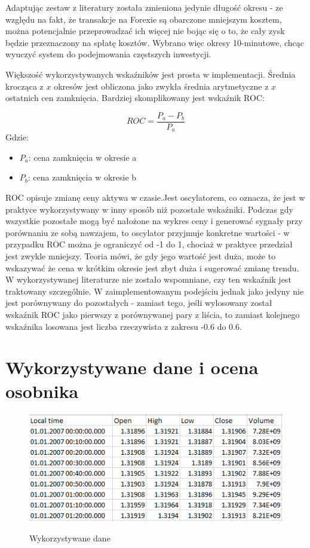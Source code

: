 \documentclass[twoside]{iisthesis}
\begin{document}
Adaptując zestaw z literatury została zmieniona jedynie długość okresu - ze względu na fakt, że transakcje na Forexie są obarczone mniejszym kosztem, można potencjalnie przeprowadzać ich więcej nie bojąc się o to, że cały zysk będzie przeznaczony na spłatę kosztów. Wybrano więc okresy 10-minutowe, chcąc wyuczyć system do podejmowania częstszych inwestycji.

Większość wykorzystywanych wskaźników jest prosta w implementacji. Średnia krocząca z $x$ okresów jest obliczona jako zwykła średnia arytmetyczne z $x$ ostatnich cen zamknięcia. Bardziej skomplikowany jest wskaźnik ROC:

\[ROC= \frac{P_{a} - P_{b}}{P_{a}}\]
Gdzie:
\begin{itemize}[label=]
	\item $P_a$: cena zamknięcia w okresie a
	\item $P_b$: cena zamknięcia w okresie b
\end{itemize}

ROC opisuje zmianę ceny aktywa w czasie.Jest oscylatorem, co oznacza, że jest w praktyce wykorzystywany w inny sposób niż pozostałe wskaźniki. Podczas gdy wszystkie pozostałe mogą być nałożone na wykres ceny i generować sygnały przy porównaniu ze sobą nawzajem, to oscylator przyjmuje konkretne wartości - w przypadku ROC można je ograniczyć od -1 do 1, chociaż w praktyce przedział jest zwykle mniejszy. Teoria mówi, że gdy jego wartość jest duża, może to wskazywać że cena w krótkim okresie jest zbyt duża i sugerować zmianę trendu. W wykorzystywanej literaturze nie zostało wspomniane, czy ten wskaźnik jest traktowany szczególnie. W zaimplementowanym podejściu jednak jako jedyny nie jest porównywany do pozostałych - zamiast tego, jeśli wylosowany został wskaźnik ROC jako pierwszy z porównywanej pary z liścia, to zamiast kolejnego wskaźnika losowana jest  liczba rzeczywista z zakresu -0.6 do 0.6. 

\section {Wykorzystywane dane i ocena osobnika}

\begin{figure}[h]
\center
\caption {Wykorzystywane dane}
\includegraphics{data}
\label{fig:data}
\end{figure}
\end{document}
